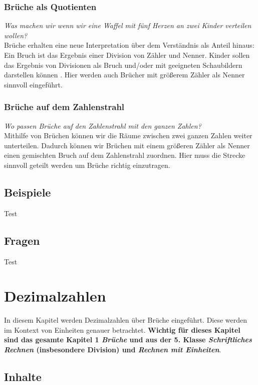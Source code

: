 \documentclass{article}
\begin{document}
\subsubsection*{Brüche als Quotienten}
\textit{Was machen wir wenn wir eine Waffel mit fünf Herzen an zwei Kinder verteilen wollen?}\\
Brüche erhalten eine neue Interpretation über dem Verständnis als Anteil hinaus: Ein Bruch ist das Ergebnis einer Division von Zähler und Nenner.
Kinder sollen das Ergebnis von Divisionen als Bruch und/oder mit geeigneten Schaubildern darstellen können .
Hier werden auch Brücher mit größerem Zähler als Nenner sinnvoll eingeführt.
\subsubsection*{Brüche auf dem Zahlenstrahl}
\textit{Wo passen Brüche auf den Zahlenstrahl mit den ganzen Zahlen?}\\
Mithilfe von Brüchen können wir die Räume zwischen zwei ganzen Zahlen weiter unterteilen.
Dadurch können wir Brüchen mit einem größeren Zähler als Nenner einen gemischten Bruch auf dem Zahlenstrahl zuordnen.
Hier muss die Strecke sinnvoll geteilt werden um Brüche richtig einzutragen.
\subsection{Beispiele}
\begin{tcolorbox}[colback=gray!5!white,colframe=gray!25!black]
Test
\end{tcolorbox}
\subsection{Fragen}
\begin{tcolorbox}[colback=blue!5!white,colframe=blue!25!black]
Test
\end{tcolorbox}
\newpage
\section{Dezimalzahlen}
In diesem Kapitel werden Dezimalzahlen über Brüche eingeführt. Diese werden im Kontext von Einheiten genauer betrachtet.
\textbf{Wichtig für dieses Kapitel sind das gesamte Kapitel 1 \textit{Brüche} und aus der 5. Klasse \textit{Schriftliches Rechnen} (insbesondere Division) und \textit{Rechnen mit Einheiten}}.
\subsection{Inhalte}
\end{document}
